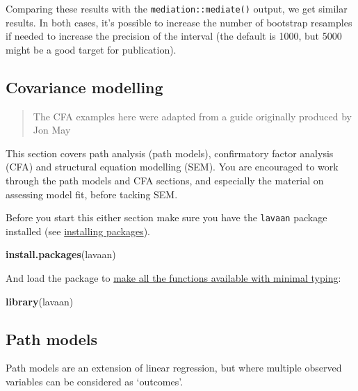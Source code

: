 \documentclass[]{article}
\newenvironment{Shaded}{\begin{snugshade}}{\end{snugshade}}
\newcommand{\KeywordTok}[1]{\textcolor[rgb]{0.13,0.29,0.53}{\textbf{#1}}}
\newcommand{\NormalTok}[1]{#1}
\begin{document}
Comparing these results with the \texttt{mediation::mediate()} output, we get similar
results. In both cases, it's possible to increase the number of bootstrap
resamples if needed to increase the precision of the interval (the default is
1000, but 5000 might be a good target for publication).

\hypertarget{covariance-modelling}{%
\subsection*{Covariance modelling}\label{covariance-modelling}}

\begin{quote}
The CFA examples here were adapted from a guide originally produced by Jon May
\end{quote}

This section covers path analysis (path models), confirmatory factor analysis
(CFA) and structural equation modelling (SEM). You are encouraged to work
through the path models and CFA sections, and especially the material on
assessing model fit, before tacking SEM.

Before you start this either section make sure you have the \texttt{lavaan} package
installed (see \protect\hyperlink{packages}{installing packages}).

\begin{Shaded}
\begin{Highlighting}[]
\KeywordTok{install.packages}\NormalTok{(lavaan)}
\end{Highlighting}
\end{Shaded}

And load the package to
\protect\hyperlink{package-namespacing}{make all the functions available with minimal typing}:

\begin{Shaded}
\begin{Highlighting}[]
\KeywordTok{library}\NormalTok{(lavaan)}
\end{Highlighting}
\end{Shaded}

\hypertarget{path-models}{%
\subsection*{Path models}\label{path-models}}

Path models are an extension of linear regression, but where multiple observed
variables can be considered as `outcomes'.
\end{document}
